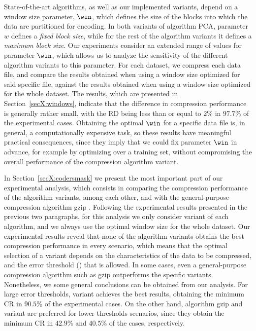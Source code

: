 State-of-the-art algorithms, as well as our implemented variants, depend on a window size parameter, $\win$, which defines the size of the blocks into which the data are partitioned for encoding. In both variants of algorithm PCA, parameter $w$ defines a \textit{fixed block size}, while for the rest of the algorithm variants it defines a \textit{maximum block size}. Our experiments consider an extended range of values for parameter $\win$, which allows us to analyze the sensitivity of the different algorithm variants to this parameter. For each dataset, we compress each data file, and compare the results obtained when using a window size optimized for said specific file, against the results obtained when using a window size optimized for the whole dataset. The results, which are presented in Section~\ref{secX:windows}, indicate that the difference in compression performance is generally rather small, with the RD being less than or equal to $2\%$ in $97.7\%$ of the experimental cases. Obtaining the optimal $\win$ for a specific data file is, in general, a computationally expensive task, so these results have meaningful practical consequences, since they imply that we could fix parameter $\win$ in advance, for example by optimizing over a training set, without compromising the overall performance of the compression algorithm variant. 


In Section~\ref{secX:codersmask} we present the most important part of our experimental analysis, which consists in comparing the compression performance of the algorithm variants, among each other, and with the general-purpose compression algorithm gzip \cite{gzip}. Following the experimental results presented in the previous two paragraphs, for this analysis we only consider variant \maskalgo of each algorithm, and we always use the optimal window size for the whole dataset. Our experimental results reveal that none of the algorithm variants obtains the best compression performance in every scenario, which means that the optimal selection of a variant depends on the characteristics of the data to be compressed, and the error threshold (\maxerror) that is allowed. In some cases, even a general-purpose compression algorithm such as gzip outperforms the specific variants. Nonetheless, we some general conclusions can be obtained from our analysis. For large error thresholds, variant  achieves the best results, obtaining the minimum CR in $90.5\%$ of the experimental cases. On the other hand, algorithm gzip and variant  are preferred for lower thresholds scenarios, since they obtain the minimum CR in $42.9\%$ and $40.5\%$ of the cases, respectively.


